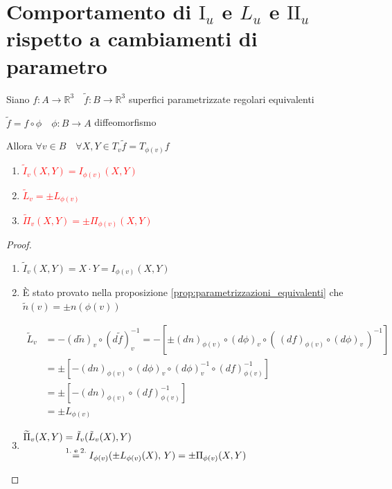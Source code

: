    \section{Comportamento di \texorpdfstring{$\mathrm{I}_u$ e $L_u$ e $\mathrm{II}_u$}{I\_u, L\_u e II\_u} rispetto a cambiamenti di parametro}
        \begin{proposizione}
        \label{prop:comportamento_cambiamenti_di_parametri_superfici_forme_fondamentali}
        \mbox{}

        Siano $f \colon A \to \mathbb{R}^3 \quad \tilde{f} \colon B \to \mathbb{R}^3$ superfici parametrizzate regolari equivalenti 

        $\tilde{f} = f \circ \phi \quad \phi \colon B \to A$ diffeomorfismo

        Allora $\forall v \in B \quad \forall X,Y \in T_v \tilde{f} = T_{\phi(v)} f $
        \begin{enumerate}
            \item \textcolor{red}{$\tilde{I}_v (X,Y) = I_{\phi(v)} (X,Y)$}
            \item \textcolor{red}{$\tilde{L}_v = \pm L_{\phi(v)}$}
            \item \textcolor{red}{$\widetilde{\Pi}_v(X,Y) =  \pm \Pi_{\phi(v)}(X,Y)$}
        \end{enumerate}
        \end{proposizione}
        \begin{proof}
        \mbox{}
        
        \begin{enumerate}
            \item $\tilde{I}_v (X,Y) = X \cdot Y = I_{\phi(v)} (X,Y)$
            \item È stato provato nella proposizione \ref{prop:parametrizzazioni_equivalenti} che $\tilde{n} (v) = \pm n(\phi(v)) $
    
            $\begin{aligned}
                \tilde{L}_v &= - (d \tilde{n})_v \circ (d \tilde{f})^{-1}_v 
                = - \left[ \pm (d n)_{\phi(v)} \circ (d \phi)_v \circ \left( \, (df)_{\phi(v)} \circ (d \phi)_v \, \right)^{-1} \right] \\
                &= \pm \left[- (d n)_{\phi(v)} \circ (d \phi)_v \circ (d \phi)_v^{-1} \circ (df)_{\phi(v)}^{-1} \right] \\
                &= \pm \left[- (d n)_{\phi(v)} \circ (df)_{\phi(v)}^{-1} \right] \\
                &= \pm L_{\phi(v)}
            \end{aligned}$
            \item  
            \mbox{}

            $\begin{aligned}
                \widetilde{\Pi}_v(X,Y) &= \tilde{I}_v ( \tilde{L}_v(X), Y) \\ 
                &\overset{\textcolor{black}{1. \text{ e } 2.}}{=} I_{\phi(v)} ( \pm L_{\phi(v)}(X), \, Y) = \pm \Pi_{\phi(v)}(X,Y)
            \end{aligned}$
            \end{enumerate}
        \end{proof}
